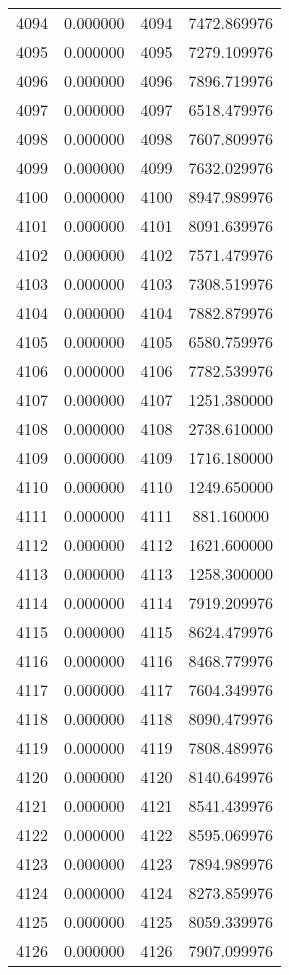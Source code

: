 \documentclass[12pt]{article}
\begin{document}
\begin{longtable}{@{}cccc@{}}
4094 & 0.000000 & 4094 & 7472.869976 \\
4095 & 0.000000 & 4095 & 7279.109976 \\
4096 & 0.000000 & 4096 & 7896.719976 \\
4097 & 0.000000 & 4097 & 6518.479976 \\
4098 & 0.000000 & 4098 & 7607.809976 \\
4099 & 0.000000 & 4099 & 7632.029976 \\
4100 & 0.000000 & 4100 & 8947.989976 \\
4101 & 0.000000 & 4101 & 8091.639976 \\
4102 & 0.000000 & 4102 & 7571.479976 \\
4103 & 0.000000 & 4103 & 7308.519976 \\
4104 & 0.000000 & 4104 & 7882.879976 \\
4105 & 0.000000 & 4105 & 6580.759976 \\
4106 & 0.000000 & 4106 & 7782.539976 \\
4107 & 0.000000 & 4107 & 1251.380000 \\
4108 & 0.000000 & 4108 & 2738.610000 \\
4109 & 0.000000 & 4109 & 1716.180000 \\
4110 & 0.000000 & 4110 & 1249.650000 \\
4111 & 0.000000 & 4111 & 881.160000 \\
4112 & 0.000000 & 4112 & 1621.600000 \\
4113 & 0.000000 & 4113 & 1258.300000 \\
4114 & 0.000000 & 4114 & 7919.209976 \\
4115 & 0.000000 & 4115 & 8624.479976 \\
4116 & 0.000000 & 4116 & 8468.779976 \\
4117 & 0.000000 & 4117 & 7604.349976 \\
4118 & 0.000000 & 4118 & 8090.479976 \\
4119 & 0.000000 & 4119 & 7808.489976 \\
4120 & 0.000000 & 4120 & 8140.649976 \\
4121 & 0.000000 & 4121 & 8541.439976 \\
4122 & 0.000000 & 4122 & 8595.069976 \\
4123 & 0.000000 & 4123 & 7894.989976 \\
4124 & 0.000000 & 4124 & 8273.859976 \\
4125 & 0.000000 & 4125 & 8059.339976 \\
4126 & 0.000000 & 4126 & 7907.099976 \\

\end{longtable}
\end{document}
